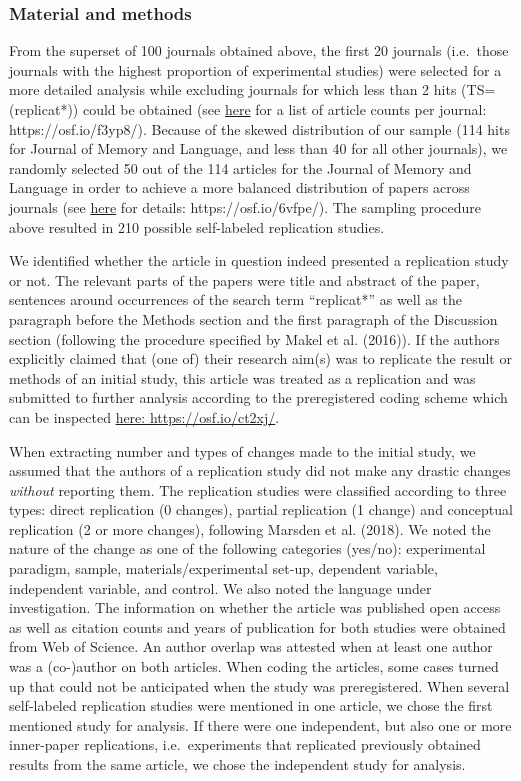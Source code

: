 \documentclass[]{elsarticle} %
\begin{document}
\hypertarget{material-and-methods-1}{%
\subsubsection{Material and methods}\label{material-and-methods-1}}

From the superset of 100 journals obtained above, the first 20 journals
(i.e.~those journals with the highest proportion of experimental
studies) were selected for a more detailed analysis while excluding
journals for which less than 2 hits (TS=(replicat*)) could be obtained
(see \href{https://osf.io/f3yp8/}{here} for a list of article counts per
journal: https://osf.io/f3yp8/). Because of the skewed distribution of
our sample (114 hits for Journal of Memory and Language, and less than
40 for all other journals), we randomly selected 50 out of the 114
articles for the Journal of Memory and Language in order to achieve a
more balanced distribution of papers across journals (see
\href{https://osf.io/6vfpe/}{here} for details: https://osf.io/6vfpe/).
The sampling procedure above resulted in 210 possible self-labeled
replication studies.

We identified whether the article in question indeed presented a
replication study or not. The relevant parts of the papers were title
and abstract of the paper, sentences around occurrences of the search
term ``replicat*'' as well as the paragraph before the Methods section
and the first paragraph of the Discussion section (following the
procedure specified by Makel et al. (2016)). If the authors explicitly
claimed that (one of) their research aim(s) was to replicate the result
or methods of an initial study, this article was treated as a
replication and was submitted to further analysis according to the
preregistered coding scheme which can be inspected
\href{https://osf.io/ct2xj/}{here: https://osf.io/ct2xj/}.

When extracting number and types of changes made to the initial study,
we assumed that the authors of a replication study did not make any
drastic changes \emph{without} reporting them. The replication studies
were classified according to three types: direct replication (0
changes), partial replication (1 change) and conceptual replication (2
or more changes), following Marsden et al. (2018). We noted the nature
of the change as one of the following categories (yes/no): experimental
paradigm, sample, materials/experimental set-up, dependent variable,
independent variable, and control. We also noted the language under
investigation. The information on whether the article was published open
access as well as citation counts and years of publication for both
studies were obtained from Web of Science. An author overlap was
attested when at least one author was a (co-)author on both articles.
When coding the articles, some cases turned up that could not be
anticipated when the study was preregistered. When several self-labeled
replication studies were mentioned in one article, we chose the first
mentioned study for analysis. If there were one independent, but also
one or more inner-paper replications, i.e.~experiments that replicated
previously obtained results from the same article, we chose the
independent study for analysis.
\end{document}
